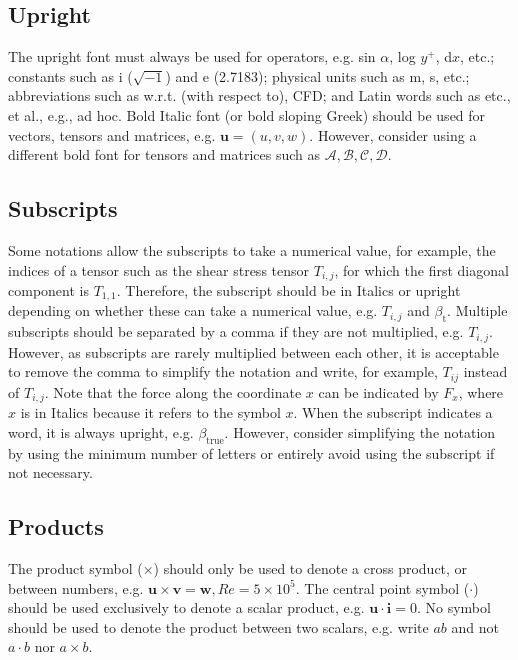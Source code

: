 \documentclass{article}
\begin{document}
\subsection{Upright}

The upright font must always be used for operators, e.g. sin $\alpha$, log $y^+$, d$x$, etc.; constants such as i ($\sqrt{-1}$) and e (2.7183); physical units such as m, s, etc.; abbreviations such as w.r.t. (with respect to), CFD; and Latin words such as etc., et al., e.g., ad hoc. 
Bold Italic font (or bold sloping Greek) should be used for vectors, tensors and matrices, e.g. $\bm{u}=(u,v,w).$ However, consider using a different bold font for tensors and matrices such as $\bm{\mathcal{A,B,C,D}}$.

\subsection{Subscripts}

Some notations allow the subscripts to take a numerical value, for example, the indices of a tensor such as the shear stress tensor $T_{i,j}$, for which the first diagonal component is $T_{1,1}$. Therefore, the subscript should be in Italics or upright depending on whether these can take a numerical value, e.g. $T_{i,j}$ and $\beta_\text{t}$. Multiple subscripts should be separated by a comma if they are not multiplied, e.g. $T_{i,j}$. However, as subscripts are rarely multiplied between each other, it is acceptable to remove the comma to simplify the notation and write, for example, $T_{ij}$ instead of $T_{i,j}$. Note that the force along the coordinate $x$ can be indicated by $F_x$, where $x$ is in Italics because it refers to the symbol $x$. When the subscript indicates a word, it is always upright, e.g. $\beta_\mathrm{true}$. However, consider simplifying the notation by using the minimum number of letters or entirely avoid using the subscript if not necessary. 

\subsection{Products}

The product symbol ($\times$) should only be used to denote a cross product, or between numbers, e.g. $\bm{u}\times \bm{v}=\bm{w}, Re=5\times 10^5.$ The central point symbol ($\cdot$) should be used exclusively to denote a scalar product, e.g. $\bm{u}\cdot \bm{i}=0$. No symbol should be used to denote the product between two scalars, e.g. write $ab$ and not $a\cdot b$ nor $a\times b$.
\end{document}
